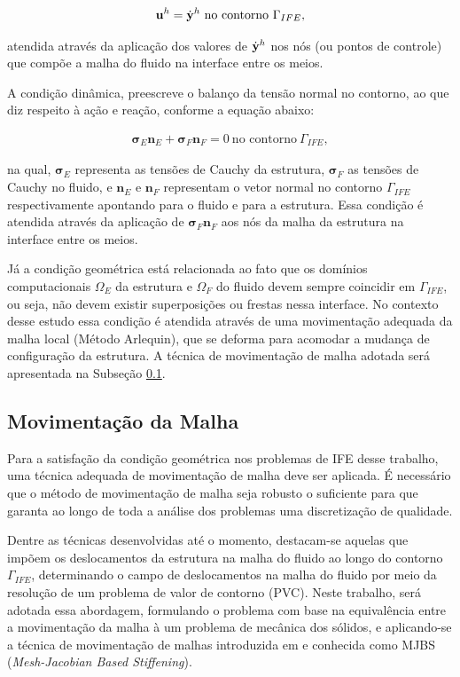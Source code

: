 \documentclass[tese_patricia]{subfiles}
\begin{document}
\begin{align}
	\mathbf{u}^h = \dot{\mathbf{y}}^h \ \textrm{no contorno} \ \Gamma_{IFE},
\end{align}

\noindent atendida através da aplicação dos valores de $\dot{\mathbf{y}}^h$ nos nós (ou pontos de controle) que compõe a malha do fluido na interface entre os meios.

A condição dinâmica, preescreve o balanço da tensão normal no contorno, ao que diz respeito à ação e reação, conforme a equação abaixo:

\begin{align}
	\mathbf{\sigma}_{E}\mathbf{n}_{E} + \mathbf{\sigma}_{F}\mathbf{n}_{F} = 0 \ \textrm{no contorno} \ \Gamma_{IFE},
\end{align}

\noindent na qual, $\mathbf{\sigma}_{E}$ representa as tensões de Cauchy da estrutura, $\mathbf{\sigma}_{F}$ as tensões de Cauchy no fluido, e $\mathbf{n}_E$ e $\mathbf{n}_F$ representam o vetor normal no contorno $\Gamma_{IFE}$ respectivamente apontando para o fluido e para a estrutura. Essa condição é atendida através da aplicação de $\mathbf{\sigma}_{F}\mathbf{n}_{F}$ aos nós da malha da estrutura na interface entre os meios.

Já a condição geométrica está relacionada ao fato que os domínios computacionais $\Omega_E$ da estrutura e $\Omega_F$ do fluido devem sempre coincidir em $\Gamma_{IFE}$, ou seja, não devem existir superposições ou frestas nessa interface. No contexto desse estudo essa condição é atendida através de uma movimentação adequada da malha local (Método Arlequin), que se deforma para acomodar a mudança de configuração da estrutura. A técnica de movimentação de malha adotada será apresentada na Subseção \ref{subsec:MovMalha}.

\subsection{Movimentação da Malha} \label{subsec:MovMalha}

Para a satisfação da condição geométrica nos problemas de IFE desse trabalho, uma técnica adequada de movimentação de malha deve ser aplicada. É necessário que o método de movimentação de malha seja robusto o suficiente para que garanta ao longo de toda a análise dos problemas uma discretização de qualidade.

Dentre as técnicas desenvolvidas até o momento, destacam-se aquelas que impõem os deslocamentos da estrutura na malha do fluido ao longo do contorno $\Gamma_{IFE}$, determinando o campo de deslocamentos na malha do fluido por meio da resolução de um problema de valor de contorno (PVC). Neste trabalho, será adotada essa abordagem, formulando o problema com base na equivalência entre a movimentação da malha à um problema de mecânica dos sólidos, e aplicando-se a técnica de movimentação de malhas introduzida em  e  conhecida como MJBS (\textit{Mesh-Jacobian Based Stiffening}).
\end{document}
